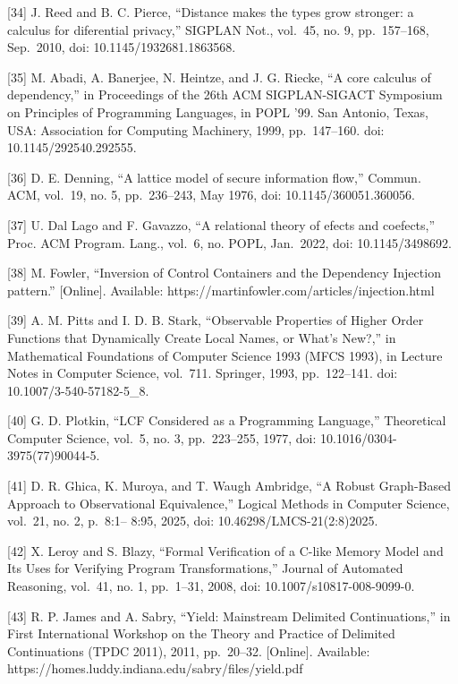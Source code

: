 \documentclass[
  10
]{article}
\begin{document}
{[}34{]} J. Reed and B. C. Pierce, ``Distance makes the types grow
stronger: a calculus for diferential privacy,'' SIGPLAN Not., vol.~45,
no. 9, pp.~157--168, Sep.~2010, doi: 10.1145/1932681.1863568.

{[}35{]} M. Abadi, A. Banerjee, N. Heintze, and J. G. Riecke, ``A core
calculus of dependency,'' in Proceedings of the 26th ACM SIGPLAN-SIGACT
Symposium on Principles of Programming Languages, in POPL '99. San
Antonio, Texas, USA: Association for Computing Machinery, 1999,
pp.~147--160. doi: 10.1145/292540.292555.

{[}36{]} D. E. Denning, ``A lattice model of secure information flow,''
Commun. ACM, vol.~19, no. 5, pp.~236--243, May 1976, doi:
10.1145/360051.360056.

{[}37{]} U. Dal Lago and F. Gavazzo, ``A relational theory of efects and
coefects,'' Proc. ACM Program. Lang., vol.~6, no. POPL, Jan.~2022, doi:
10.1145/3498692.

{[}38{]} M. Fowler, ``Inversion of Control Containers and the Dependency
Injection pattern.'' {[}Online{]}. Available:
https://martinfowler.com/articles/injection.html

{[}39{]} A. M. Pitts and I. D. B. Stark, ``Observable Properties of
Higher Order Functions that Dynamically Create Local Names, or What's
New?,'' in Mathematical Foundations of Computer Science 1993 (MFCS
1993), in Lecture Notes in Computer Science, vol.~711. Springer, 1993,
pp.~122--141. doi: 10.1007/3-540-57182-5\_8.

{[}40{]} G. D. Plotkin, ``LCF Considered as a Programming Language,''
Theoretical Computer Science, vol.~5, no. 3, pp.~223--255, 1977, doi:
10.1016/0304-3975(77)90044-5.

{[}41{]} D. R. Ghica, K. Muroya, and T. Waugh Ambridge, ``A Robust
Graph-Based Approach to Observational Equivalence,'' Logical Methods in
Computer Science, vol.~21, no. 2, p.~8:1-- 8:95, 2025, doi:
10.46298/LMCS-21(2:8)2025.

{[}42{]} X. Leroy and S. Blazy, ``Formal Verification of a C-like Memory
Model and Its Uses for Verifying Program Transformations,'' Journal of
Automated Reasoning, vol.~41, no. 1, pp.~1--31, 2008, doi:
10.1007/s10817-008-9099-0.

{[}43{]} R. P. James and A. Sabry, ``Yield: Mainstream Delimited
Continuations,'' in First International Workshop on the Theory and
Practice of Delimited Continuations (TPDC 2011), 2011, pp.~20--32.
{[}Online{]}. Available:
https://homes.luddy.indiana.edu/sabry/files/yield.pdf
\end{document}
